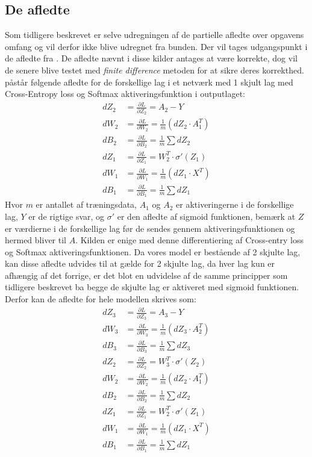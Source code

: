 \documentclass{article}
\begin{document}
\subsection{De afledte}
Som tidligere beskrevet er selve udregningen af de partielle afledte over opgavens omfang og vil derfor ikke blive udregnet fra bunden. Der vil tages udgangspunkt i de afledte fra \parencite{keita2023backpropagation,verma2020neuralnet,kurbiel2021softmax}. De afledte nævnt i disse kilder antages at være korrekte, dog vil de senere blive testet med \textit{finite difference} metoden for at sikre deres korrekthed. \parencite{verma2020neuralnet} påstår følgende afledte for de forskellige lag i et netværk med 1 skjult lag med Cross-Entropy loss og Softmax aktiveringsfunktion i outputlaget:
\begin{align}
  dZ_2 &= \frac{\partial L}{\partial Z_2} = A_2 - Y\\
  dW_2 &= \frac{\partial L}{\partial W_2} = \frac{1}{m}(dZ_2 \cdot A_1^T)\\
  dB_2 &= \frac{\partial L}{\partial B_2} = \frac{1}{m}\sum dZ_2\\
  dZ_1 &= \frac{\partial L}{\partial Z_1} = W_2^T \cdot \sigma'(Z_1)\\
  dW_1 &= \frac{\partial L}{\partial W_1} = \frac{1}{m}(dZ_1 \cdot X^T)\\
  dB_1 &= \frac{\partial L}{\partial B_1} = \frac{1}{m}\sum dZ_1
\end{align}
Hvor $m$ er antallet af træningsdata, $A_1$ og $A_2$ er aktiveringerne i de forskellige lag, $Y$ er de rigtige svar, og $\sigma'$ er den afledte af sigmoid funktionen, bemærk at $Z$ er værdierne i de forskellige lag før de sendes gennem aktiveringsfunktionen og hermed bliver til $A$. Kilden \parencite{kurbiel2021softmax} er enige med denne differentiering af Cross-entry loss og Softmax aktiveringsfunktionen. Da vores model er bestående af 2 skjulte lag, kan disse afledte udvides til at gælde for 2 skjulte lag, da hver lag kun er afhængig af det forrige, er det blot en udvidelse af de samme principper som tidligere beskrevet ba begge de skjulte lag er aktiveret med sigmoid funktionen. Derfor kan de afledte for hele modellen skrives som:
\begin{align}
  dZ_3 &= \frac{\partial L}{\partial Z_3} = A_3 - Y\\
  dW_3 &= \frac{\partial L}{\partial W_3} = \frac{1}{m}(dZ_3 \cdot A_2^T)\\
  dB_3 &= \frac{\partial L}{\partial B_3} = \frac{1}{m}\sum dZ_3\\
  dZ_2 &= \frac{\partial L}{\partial Z_2} = W_3^T \cdot \sigma'(Z_2)\\
  dW_2 &= \frac{\partial L}{\partial W_2} = \frac{1}{m}(dZ_2 \cdot A_1^T)\\
  dB_2 &= \frac{\partial L}{\partial B_2} = \frac{1}{m}\sum dZ_2\\
  dZ_1 &= \frac{\partial L}{\partial Z_1} = W_2^T \cdot \sigma'(Z_1)\\
  dW_1 &= \frac{\partial L}{\partial W_1} = \frac{1}{m}(dZ_1 \cdot X^T)\\
  dB_1 &= \frac{\partial L}{\partial B_1} = \frac{1}{m}\sum dZ_1
\end{align}
\end{document}
